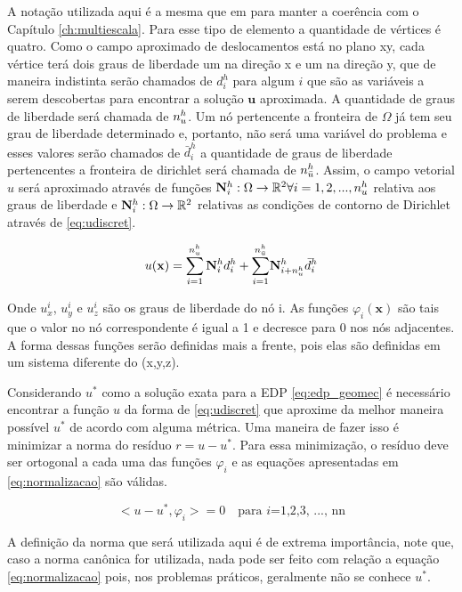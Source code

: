 A notação utilizada aqui é a mesma que em \cite{casteletto} para manter a coerência com o Capítulo \ref{ch:multiescala}. Para esse tipo de elemento a quantidade de vértices é quatro. Como o campo aproximado de deslocamentos está no plano xy, cada vértice terá dois graus de liberdade um na direção x e um na direção y, que de maneira indistinta serão chamados de $d_i^h$ para algum $i$ que são as variáveis a serem descobertas para encontrar a solução $\textbf{u}$ aproximada. A quantidade de graus de liberdade será chamada de $n_u^h$. Um nó pertencente a fronteira de $\Omega$  já tem seu grau de liberdade determinado e, portanto, não será uma variável do problema e esses valores serão chamados de $\bar{d}_i^h$ a quantidade de graus de liberdade pertencentes a fronteira de dirichlet será chamada de $n_{\bar{u}}^h$.  Assim, o campo vetorial $u$ será aproximado através de funções $ \mathbf{N}_i^h : \Omega \rightarrow \mathbb{R}^2 \forall i=1,2,...,n_u^h$  relativa aos graus de liberdade e  $ \mathbf{N}_i^h : \Omega \rightarrow \mathbb{R}^2$  relativas as condições de contorno de Dirichlet através de \eqref{eq:udiscret}.


\begin{equation}\label{eq:udiscret}
u(\mathbf{x}) = \sum_{i=1}^{n_u^h} \mathbf{N}_i^h  d_i^h + {\sum_{i=1}^ {n^h_{\bar{u}}}}  \mathbf{N}_{i+n_u^h}^h \bar{d}_i^h
\end{equation}


Onde $u^i_x$, $u^i_y$ e $u^i_z$ são os graus de liberdade do nó i. As funções $\varphi_i(\mathbf{x})$ são tais que o valor no nó correspondente é igual a 1 e decresce para 0 nos nós adjacentes. A forma dessas funções serão definidas mais a frente, pois elas são definidas em um sistema diferente do (x,y,z).


Considerando $u^*$ como a solução exata para a EDP \ref{eq:edp_geomec} é necessário encontrar a função $u$ da forma de \ref{eq:udiscret} que aproxime da melhor maneira possível $u^*$ de acordo com alguma métrica. Uma maneira de fazer isso é minimizar a norma do resíduo $r = u-u^*$. Para essa minimização, o resíduo  deve ser ortogonal a cada uma das funções $\varphi_i$ e as equações apresentadas em \ref{eq:normalizacao} são válidas.


\begin{equation}\label{eq:normalizacao}
<u-u^*, \varphi_i> = 0   \quad  \text{para $i$=1,2,3, ..., nn}
\end{equation}

A definição da norma que será utilizada aqui é de extrema importância, note que, caso a norma canônica for utilizada, nada pode ser feito com relação a equação \ref{eq:normalizacao} pois, nos problemas práticos, geralmente não se conhece $u^*$.

